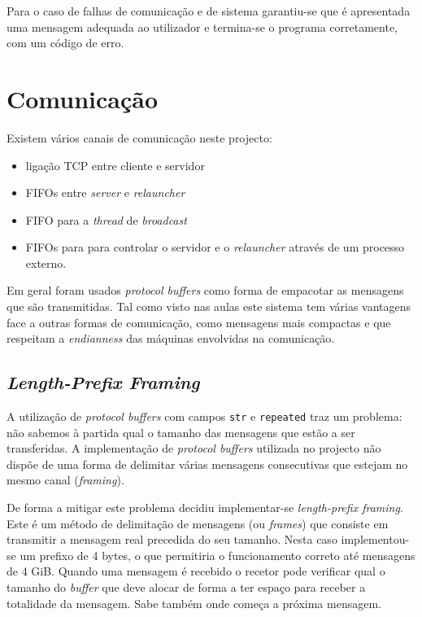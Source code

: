 \documentclass[a4paper]{article}
\begin{document}
	Para o caso de falhas de comunicação e de sistema garantiu-se que é apresentada uma mensagem adequada ao utilizador e termina-se o programa corretamente, com um código de erro.




	\section{Comunicação}

	Existem vários canais de comunicação neste projecto: 

	\begin{itemize}
		\item ligação TCP entre cliente e servidor 
		\item FIFOs entre \textit{server} e \textit{relauncher} 
		\item FIFO para a \textit{thread} de \textit{broadcast} 
		\item FIFOs para para controlar o servidor e o \textit{relauncher} através de um processo externo. 
	\end{itemize}

	Em geral foram usados \textit{protocol buffers} como forma de empacotar as mensagens que são transmitidas. Tal como visto nas aulas este sistema tem várias vantagens face a outras formas de comunicação, como mensagens mais compactas e que respeitam a \textit{endianness} das máquinas envolvidas na comunicação.

	\subsection{\textit{Length-Prefix Framing}}
	\label{subsec:length-prefixe_framing}

	A utilização de \textit{protocol buffers} com campos \texttt{str} e \texttt{repeated} traz um problema: não sabemos à partida qual o tamanho das mensagens que estão a ser transferidas. A implementação de \textit{protocol buffers} utilizada no projecto não dispõe de uma forma de delimitar várias mensagens consecutivas que estejam no mesmo canal (\textit{framing}).

	De forma a mitigar este problema decidiu implementar-se \textit{length-prefix framing}. Este é um método de delimitação de mensagens (ou \textit{frames}) que consiste em transmitir a mensagem real precedida do seu tamanho. Nesta caso implementou-se um prefixo de 4 bytes, o que permitiria o funcionamento correto até mensagens de 4 GiB. Quando uma mensagem é recebido o recetor pode verificar qual o tamanho do \textit{buffer} que deve alocar de forma a ter espaço para receber a totalidade da mensagem. Sabe também onde começa a próxima mensagem.
\end{document}
